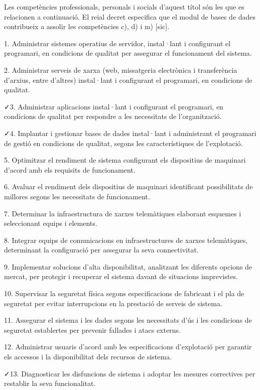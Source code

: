 \documentclass[catalan, a4paper, 12pt, titlepage]{article}
\begin{document}
Les competències professionals, personals i socials d'aquest títol són les que es relacionen a continuació. 
El reial decret especifica que el modul de bases de dades contribueix a assolir les competències c), d) i m) [sic].

1. Administrar sistemes operatius de servidor, instal·lant i configurant el programari, en condicions de qualitat per assegurar el funcionament del sistema.

2. Administrar serveis de xarxa (web, missatgeria electrònica i transferència d'arxius, entre d'altres) instal·lant i configurant el programari, en condicions de qualitat.

\faCheck 3. Administrar aplicacions instal·lant i configurant el programari, en condicions de qualitat per respondre a les necessitats de l'organització.

\faCheck 4. Implantar i gestionar bases de dades instal·lant i administrant el programari de gestió en condicions de qualitat, segons les característiques de l'explotació.

5. Optimitzar el rendiment de sistema configurant els dispositius de maquinari d'acord amb els requisits de funcionament.

6. Avaluar el rendiment dels dispositius de maquinari identificant possibilitats de millores segons les necessitats de funcionament.

7. Determinar la infraestructura de xarxes telemàtiques elaborant esquemes i seleccionant equips i elements.

8. Integrar equips de comunicacions en infraestructures de xarxes telemàtiques, determinant la configuració per assegurar la seva connectivitat.

9. Implementar solucions d'alta disponibilitat, analitzant les diferents opcions de mercat, per protegir i recuperar el sistema davant de situacions imprevistes.

10. Supervisar la seguretat física segons especificacions de fabricant i el pla de seguretat per evitar interrupcions en la prestació de serveis de sistema.

11. Assegurar el sistema i les dades segons les necessitats d'ús i les condicions de seguretat establertes per prevenir fallades i atacs externs.

12. Administrar usuaris d'acord amb les especificacions d'explotació per garantir els accessos i la disponibilitat dels recursos de sistema.

\faCheck 13. Diagnosticar les disfuncions de sistema i adoptar les mesures correctives per restablir la seva funcionalitat.
\end{document}
